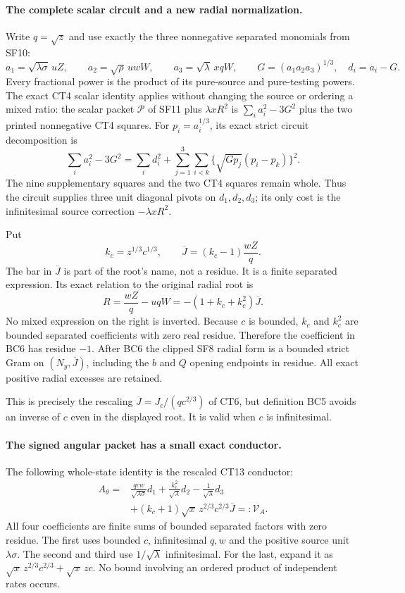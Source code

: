 \paragraph{The complete scalar circuit and a new radial normalization.}
Write $q=\sqrt z$ and use exactly the three nonnegative separated
monomials from SF10:
\[
 a_1=\sqrt{\lambda\sigma}\,uZ,\qquad
 a_2=\sqrt\rho\,uwW,\qquad
 a_3=\sqrt\lambda\,xqW,
 \qquad G=(a_1a_2a_3)^{1/3},\quad d_i=a_i-G.
 \tag{BC3}
\]
Every fractional power is the product of its pure-source and
pure-testing powers. The exact CT4 scalar identity applies without
changing the source or ordering a mixed ratio: the scalar packet
$\mathscr P$ of SF11 plus $\lambda xR^2$ is
$\sum_i a_i^2-3G^2$ plus the two printed nonnegative CT4 squares.
For $p_i=a_i^{1/3}$, its exact strict circuit decomposition is
\[
 \sum_i a_i^2-3G^2
 =\sum_i d_i^2+
   \sum_{j=1}^3\sum_{i<k}
       \{\sqrt{Gp_j}(p_i-p_k)\}^2.
 \tag{BC4}
\]
The nine supplementary squares and the two CT4 squares remain whole.
Thus the circuit supplies three unit diagonal pivots on $d_1,d_2,d_3$;
its only cost is the infinitesimal source correction $-\lambda xR^2$.

Put
\[
 k_c=z^{1/3}c^{1/3},\qquad
 \overline J=(k_c-1)\frac{wZ}{q}.
 \tag{BC5}
\]
The bar in $\overline J$ is part of the root's name, not a residue.
It is a finite separated expression. Its exact relation to the
original radial root is
\[
 R=\frac{wZ}{q}-uqW
       =-(1+k_c+k_c^2)\overline J.
 \tag{BC6}
\]
No mixed expression on the right is inverted. Because $c$ is bounded,
$k_c$ and $k_c^2$ are bounded separated coefficients with zero real
residue. Therefore the coefficient in BC6 has residue $-1$.
After BC6 the clipped SF8 radial form is a bounded strict Gram on
$(N_y,\overline J)$, including the $b$ and $Q$ opening endpoints
in residue. All exact positive radial excesses are retained.

This is precisely the rescaling
$\overline J=J_c/(q c^{2/3})$ of CT6, but definition BC5 avoids
an inverse of $c$ even in the displayed root. It is valid when
$c$ is infinitesimal.

\paragraph{The signed angular packet has a small exact conductor.}
The following whole-state identity is the rescaled CT13 conductor:
\[
\begin{split}
 A_\theta={}&
 \frac{qcw}{\sqrt{\lambda\sigma}}d_1
 +\frac{k_c^2}{\sqrt\lambda}d_2
 -\frac1{\sqrt\lambda}d_3\\
 &+(k_c+1)\sqrt x\,z^{2/3}c^{2/3}\overline J
 =:\mathcal V_A.
\end{split}\tag{BC7}
\]
All four coefficients are finite sums of bounded separated factors
with zero residue. The first uses bounded $c$, infinitesimal $q,w$
and the positive source unit $\lambda\sigma$. The second and third
use $1/\sqrt\lambda$ infinitesimal. For the last, expand it as
$\sqrt x\,z^{2/3}c^{2/3}+\sqrt x\,zc$.
No bound involving an ordered product of independent rates occurs.


